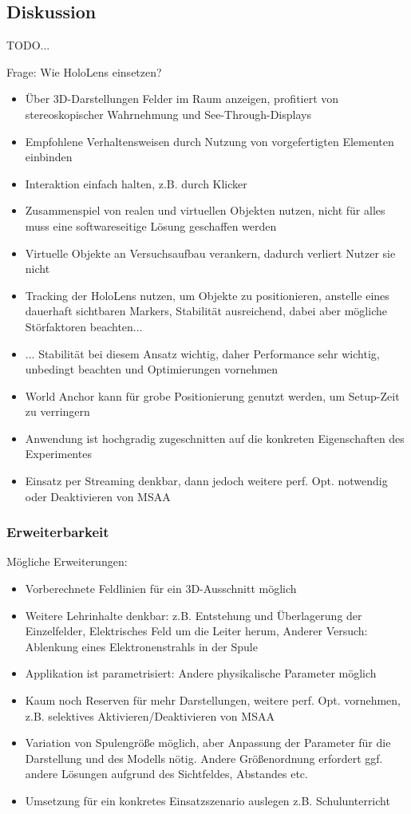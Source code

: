 \subsection{Diskussion}
TODO...

Frage: Wie HoloLens einsetzen?

\begin{itemize}
	\item Über 3D-Darstellungen Felder im Raum anzeigen, profitiert von stereoskopischer Wahrnehmung und See-Through-Displays
	\item Empfohlene Verhaltensweisen durch Nutzung von vorgefertigten Elementen einbinden
	\item Interaktion einfach halten, z.B. durch Klicker
	\item Zusammenspiel von realen und virtuellen Objekten nutzen, nicht für alles muss eine softwareseitige Lösung geschaffen werden
	\item Virtuelle Objekte an Versuchsaufbau verankern, dadurch verliert Nutzer sie nicht
	\item Tracking der HoloLens nutzen, um Objekte zu positionieren, anstelle eines dauerhaft sichtbaren Markers, Stabilität ausreichend, dabei aber mögliche Störfaktoren beachten...
	\item ... Stabilität bei diesem Ansatz wichtig, daher Performance sehr wichtig, unbedingt beachten und Optimierungen vornehmen
	\item World Anchor kann für grobe Positionierung genutzt werden, um Setup-Zeit zu verringern
	\item Anwendung ist hochgradig zugeschnitten auf die konkreten Eigenschaften des Experimentes
	\item Einsatz per Streaming denkbar, dann jedoch weitere perf. Opt. notwendig oder Deaktivieren von MSAA
\end{itemize}


\subsubsection{Erweiterbarkeit}
Mögliche Erweiterungen:
\begin{itemize}
	\item Vorberechnete Feldlinien für ein 3D-Ausschnitt möglich
	\item Weitere Lehrinhalte denkbar: z.B. Entstehung und Überlagerung der Einzelfelder, Elektrisches Feld um die Leiter herum, Anderer Versuch: Ablenkung eines Elektronenstrahls in der Spule
	\item Applikation ist parametrisiert: Andere physikalische Parameter möglich
	\item Kaum noch Reserven für mehr Darstellungen, weitere perf. Opt. vornehmen, z.B. selektives Aktivieren/Deaktivieren von MSAA
	\item Variation von Spulengröße möglich, aber Anpassung der Parameter für die Darstellung und des Modells nötig. Andere Größenordnung erfordert ggf. andere Lösungen aufgrund des Sichtfeldes, Abstandes etc.
	\item Umsetzung für ein konkretes Einsatzszenario auslegen z.B. Schulunterricht
\end{itemize}

